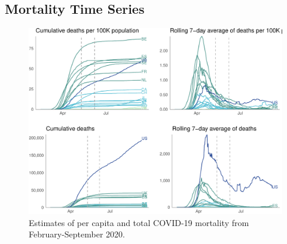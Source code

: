 \documentclass[
]{article}
\begin{document}
\hypertarget{mortality-time-series}{%
\subsection{Mortality Time Series}\label{mortality-time-series}}

\begin{figure}
\centering
\includegraphics{extended_supplement_FINAL_files/figure-latex/percapitaplot-1.pdf}
\caption{Estimates of per capita and total COVID-19 mortality from
February-September 2020.}
\end{figure}

\pagebreak
\end{document}
